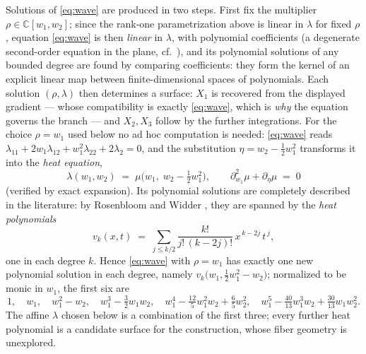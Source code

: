 \documentclass[11pt]{article}
\numberwithin{equation}{section}
\theoremstyle{plain}
\theoremstyle{definition}
\theoremstyle{remark}
\newcommand{\C}{\mathbb{C}}
\begin{document}
Solutions of \eqref{eq:wave} are produced in two steps. First fix the
multiplier $\rho\in\C[w_1,w_2]$; since the rank-one parametrization above is
linear in $\lambda$ for fixed $\rho$, equation \eqref{eq:wave} is then
\emph{linear} in $\lambda$, with polynomial coefficients (a degenerate
second-order equation in the plane, cf.\ \cite{CourantHilbert1962}), and its
polynomial solutions of any bounded degree are found by comparing
coefficients: they form the kernel of an explicit linear map between
finite-dimensional spaces of polynomials. Each solution $(\rho,\lambda)$ then
determines a surface: $X_1$ is recovered from the displayed gradient ---
whose compatibility is exactly \eqref{eq:wave}, which is \emph{why} the
equation governs the branch --- and $X_2,X_3$ follow by the further
integrations. For the choice $\rho=w_1$ used below no ad hoc computation is
needed: \eqref{eq:wave} reads
$\lambda_{11}+2w_1\lambda_{12}+w_1^2\lambda_{22}+2\lambda_2=0$, and the
substitution $\eta=w_2-\tfrac12w_1^2$ transforms it into the \emph{heat
equation},
\[
\lambda(w_1,w_2)\;=\;\mu\bigl(w_1,\;w_2-\tfrac12w_1^2\bigr),
\qquad
\partial_{w_1}^{2}\mu+\partial_\eta\mu\;=\;0
\]
(verified by exact expansion). Its polynomial solutions are completely
described in the literature: by Rosenbloom and Widder
\cite{RosenbloomWidder1959}, they are spanned by the \emph{heat polynomials}
\[
v_k(x,t)\;=\;\sum_{j\le k/2}\frac{k!}{j!\,(k-2j)!}\,x^{\,k-2j}\,t^{\,j},
\]
one in each degree $k$. Hence \eqref{eq:wave} with $\rho=w_1$ has exactly one
new polynomial solution in each degree, namely
$v_k\bigl(w_1,\tfrac12w_1^2-w_2\bigr)$; normalized to be monic in $w_1$, the
first six are
\[
1,\quad w_1,\quad w_1^2-w_2,\quad w_1^3-\tfrac32w_1w_2,\quad
w_1^4-\tfrac{12}5w_1^2w_2+\tfrac65w_2^2,\quad
w_1^5-\tfrac{40}{13}w_1^3w_2+\tfrac{30}{13}w_1w_2^2 .
\]
The affine $\lambda$ chosen below is a combination of the first three; every
further heat polynomial is a candidate surface for the construction, whose
fiber geometry is unexplored.
\end{document}
